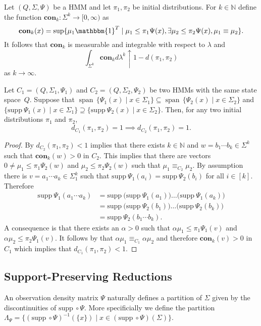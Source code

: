 \documentclass[a4paper,UKenglish,cleveref, autoref,mathscr]{lipics-v2019}
\newcommand{\NN}{\mathbb{N}}
\newcommand{\1}{\mathbbm{1}}
\newcommand{\con}{\textbf{con}}
\newcommand{\supp}{\mathrm{supp}}
\DeclareMathOperator{\Span}{span\,}
\begin{document}
\begin{lemma}\label{conconvergence}
Let $(Q, \Sigma, \Psi)$ be a HMM and let $\pi_1, \pi_2$ be initial distributions. For $k \in \NN$ define the function $\con_k : \Sigma^k \rightarrow [0,\infty)$ as 
\[\con_k(x) = \sup \{\mu_1 \1^T \mid \mu_1 \leq \pi_1 \Psi(x), \exists \mu_2 \leq \pi_2 \Psi(x), \mu_1 \equiv \mu_2\}.\]
It follows that $\con_k$ is measurable and integrable with respect to $\lambda$ and
\[\int_{\Sigma^k} \con_k d\lambda^k \uparrow 1 - d(\pi_1, \pi_2) \]
as $k \rightarrow \infty$.
\end{lemma}

\begin{lemma}\label{distance1preserving}
Let $C_1 = (Q, \Sigma_1, \Psi_1)$ and $C_2 = (Q, \Sigma_2, \Psi_2)$ be two HMMs with the same state space~$Q$.
Suppose that $\Span \{\Psi_1(x) \mid x \in \Sigma_1\} \subseteq \Span \{\Psi_2(x) \mid x \in \Sigma_2\}$ and $\{\supp~ \Psi_1(x) \mid x \in \Sigma_1 \} \supseteq \{\supp~ \Psi_2(x) \mid x \in \Sigma_2 \}$.
Then, for any two initial distributions $\pi_1$ and $\pi_2$,
\[d_{C_1}(\pi_1,\pi_2) = 1 \implies d_{C_2}(\pi_1,\pi_2) = 1.\]
\end{lemma}

\begin{proof}
By  $d_{C_2}(\pi_1,\pi_2) < 1$ implies that there exists $k \in \NN$ and $w = b_1 \cdots b_k \in \Sigma^k$ such that $\con_k(w) > 0$ in $C_2$. This implies that there are vectors $0 \neq \mu_1 \leq \pi_1 \Psi_2(w)$ and $\mu_2 \leq \pi_2 \Psi_2(w)$ such that $\mu_1 \equiv_{C_2} \mu_2$. By assumption there is $v = a_1 \cdots a_k \in \Sigma_1^k$ such that $\supp~ \Psi_1(a_i) = \supp ~\Psi_2(b_i)$ for all $i \in [k]$. Therefore
\begin{align*}
\supp~ \Psi_1(a_1 \cdots a_k) & = \supp~ \big(\supp~ \Psi_1(a_1)\big) \dots \big(\supp~\Psi_1(a_k)\big) \\
& = \supp~ \big(\supp~ \Psi_2(b_1)\big) \dots \big(\supp~\Psi_2(b_k)\big) \\
& = \supp~ \Psi_2(b_1 \cdots b_k).
\end{align*}
A consequence is that there exists an $\alpha > 0$ such that $\alpha \mu_1 \leq \pi_1 \Psi_1(v)$ and $\alpha \mu_2 \leq \pi_2 \Psi_1(v)$. It follows by  that $\alpha \mu_1 \equiv_{C_1} \alpha \mu_2$ and therefore $\con_k(v) > 0$ in $C_1$ which implies that $d_{C_1}(\pi_1,\pi_2) < 1$.
\end{proof}

\subsection{Support-Preserving Reductions}
An observation density matrix $\Psi$ naturally defines a partition of $\Sigma$ given by the discontinuities of $\supp~ \circ \Psi$. More specificially we define the partition $\Lambda_{\Psi} = \{(\supp~ \circ \Psi)^{-1}(\{x\}) \mid x \in (\supp~ \circ \Psi)(\Sigma) \}$.
\end{document}
